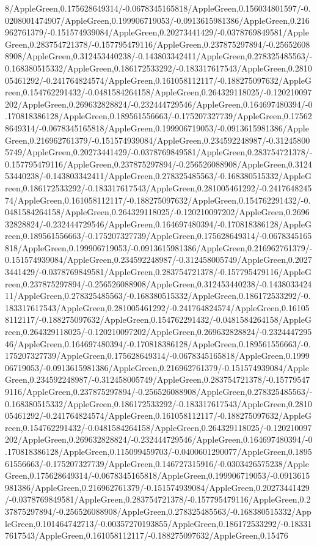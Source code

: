 {\begin{tikzternal}
{8/AppleGreen,0.175628649314/-0.0678345165818/AppleGreen,0.156034801597/-0.0208001474907/AppleGreen,0.199906719053/-0.0913615981386/AppleGreen,0.216962761379/-0.151574939084/AppleGreen,0.20273441429/-0.0378769849581/AppleGreen,0.283754721378/-0.157795479116/AppleGreen,0.237875297894/-0.256526088908/AppleGreen,0.312453440238/-0.143803342411/AppleGreen,0.278325485563/-0.168380515332/AppleGreen,0.186172533292/-0.183317617543/AppleGreen,0.281005461292/-0.241764824574/AppleGreen,0.161058112117/-0.188275097632/AppleGreen,0.154762291432/-0.0481584264158/AppleGreen,0.264329118025/-0.120210097202/AppleGreen,0.269632828824/-0.232444729546/AppleGreen,0.164697480394/-0.170818386128/AppleGreen,0.189561556663/-0.175207327739/AppleGreen,0.175628649314/-0.0678345165818/AppleGreen,0.199906719053/-0.0913615981386/AppleGreen,0.216962761379/-0.151574939084/AppleGreen,0.234592248987/-0.312458005749/AppleGreen,0.20273441429/-0.0378769849581/AppleGreen,0.283754721378/-0.157795479116/AppleGreen,0.237875297894/-0.256526088908/AppleGreen,0.312453440238/-0.143803342411/AppleGreen,0.278325485563/-0.168380515332/AppleGreen,0.186172533292/-0.183317617543/AppleGreen,0.281005461292/-0.241764824574/AppleGreen,0.161058112117/-0.188275097632/AppleGreen,0.154762291432/-0.0481584264158/AppleGreen,0.264329118025/-0.120210097202/AppleGreen,0.269632828824/-0.232444729546/AppleGreen,0.164697480394/-0.170818386128/AppleGreen,0.189561556663/-0.175207327739/AppleGreen,0.175628649314/-0.0678345165818/AppleGreen,0.199906719053/-0.0913615981386/AppleGreen,0.216962761379/-0.151574939084/AppleGreen,0.234592248987/-0.312458005749/AppleGreen,0.20273441429/-0.0378769849581/AppleGreen,0.283754721378/-0.157795479116/AppleGreen,0.237875297894/-0.256526088908/AppleGreen,0.312453440238/-0.143803342411/AppleGreen,0.278325485563/-0.168380515332/AppleGreen,0.186172533292/-0.183317617543/AppleGreen,0.281005461292/-0.241764824574/AppleGreen,0.161058112117/-0.188275097632/AppleGreen,0.154762291432/-0.0481584264158/AppleGreen,0.264329118025/-0.120210097202/AppleGreen,0.269632828824/-0.232444729546/AppleGreen,0.164697480394/-0.170818386128/AppleGreen,0.189561556663/-0.175207327739/AppleGreen,0.175628649314/-0.0678345165818/AppleGreen,0.199906719053/-0.0913615981386/AppleGreen,0.216962761379/-0.151574939084/AppleGreen,0.234592248987/-0.312458005749/AppleGreen,0.283754721378/-0.157795479116/AppleGreen,0.237875297894/-0.256526088908/AppleGreen,0.278325485563/-0.168380515332/AppleGreen,0.186172533292/-0.183317617543/AppleGreen,0.281005461292/-0.241764824574/AppleGreen,0.161058112117/-0.188275097632/AppleGreen,0.154762291432/-0.0481584264158/AppleGreen,0.264329118025/-0.120210097202/AppleGreen,0.269632828824/-0.232444729546/AppleGreen,0.164697480394/-0.170818386128/AppleGreen,0.115099459703/-0.0400601290077/AppleGreen,0.189561556663/-0.175207327739/AppleGreen,0.146727315916/-0.0303426575238/AppleGreen,0.175628649314/-0.0678345165818/AppleGreen,0.199906719053/-0.0913615981386/AppleGreen,0.216962761379/-0.151574939084/AppleGreen,0.20273441429/-0.0378769849581/AppleGreen,0.283754721378/-0.157795479116/AppleGreen,0.237875297894/-0.256526088908/AppleGreen,0.278325485563/-0.168380515332/AppleGreen,0.101464742713/-0.00357270193855/AppleGreen,0.186172533292/-0.183317617543/AppleGreen,0.161058112117/-0.188275097632/AppleGreen,0.15476}
\end{tikzternal}}
